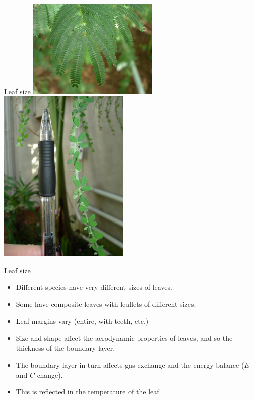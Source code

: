 \documentclass[10pt]{beamer}
\begin{document}
\begin{frame}{Leaf size}
    \centering\includegraphics[width=0.47\textwidth]{photos/Mimosoidea}%
    \includegraphics[width=0.47\textwidth]{photos/SmallLeaves}
\end{frame}

\begin{frame}{Leaf size}
    \begin{itemize}
        \item Different species have very different sizes of
        leaves.
        \item Some have composite leaves with leaflets of
        different sizes.
        \item Leaf margins vary (entire, with teeth, etc.)
        \item Size and shape affect the aerodynamic properties of
        leaves, and so the thickness of the boundary layer.
        \item The boundary layer in turn affects gas exchange and
        the energy balance ($E$ and $C$ change).
        \item This is reflected in the temperature of the leaf.
    \end{itemize}
\end{frame}
\end{document}
